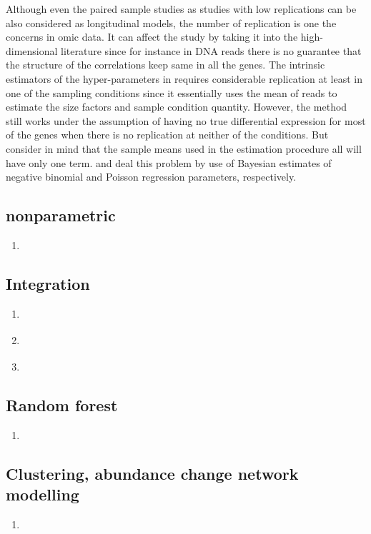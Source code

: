 \documentclass[]{article}
\begin{document}
		Although even the paired sample studies as studies with low replications can be also considered as longitudinal models, the number of replication is one the concerns in omic data. It can affect the study by taking it into the high-dimensional literature since for instance in DNA reads there is no guarantee that the structure of the correlations keep same in all the genes. The intrinsic estimators of the hyper-parameters in \cite{Anders2010} requires considerable replication at least in one of the sampling conditions since it essentially uses the mean of reads to estimate the size factors and sample condition  quantity. However, the method still works under the assumption of having no true differential expression for most of the genes when there is no replication at neither of the conditions. But consider in mind that the sample means used in the estimation procedure all will have only one term. \cite{Love2014} and \cite{Wu2012} deal this problem by use of Bayesian estimates of negative binomial and Poisson regression parameters, respectively. 
		
		
				
		\subsection{nonparametric}
		\begin{enumerate}
			\item \cite{Metwallyetal2022}
		\end{enumerate}
		
		\subsection{Integration}
		\begin{enumerate}
			\item \cite{Sperisenetal2015}
			\item \cite{Bodeinetal2021}
			\item \cite{Stanberryetal2013}
		\end{enumerate}
		
		\subsection{Random forest}
		\begin{enumerate}
			\item \cite{HuSzymczak2023}
		\end{enumerate}
		
		\subsection{Clustering, abundance change network modelling}
		\begin{enumerate}
			\item \cite{Kodikaraetal2022}
		\end{enumerate}
		
\end{document}
